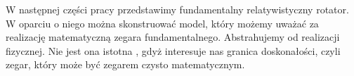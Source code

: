 W następnej części pracy przedstawimy fundamentalny 
relatywistyczny rotator. W oparciu o niego można skonstruować model,
który możemy uważać za realizację matematyczną zegara
fundamentalnego. Abstrahujemy od realizacji fizycznej. 
Nie jest ona istotna , gdyż interesuje nas granica doskonałości, 
czyli zegar, który może być
zegarem czysto matematycznym.  




